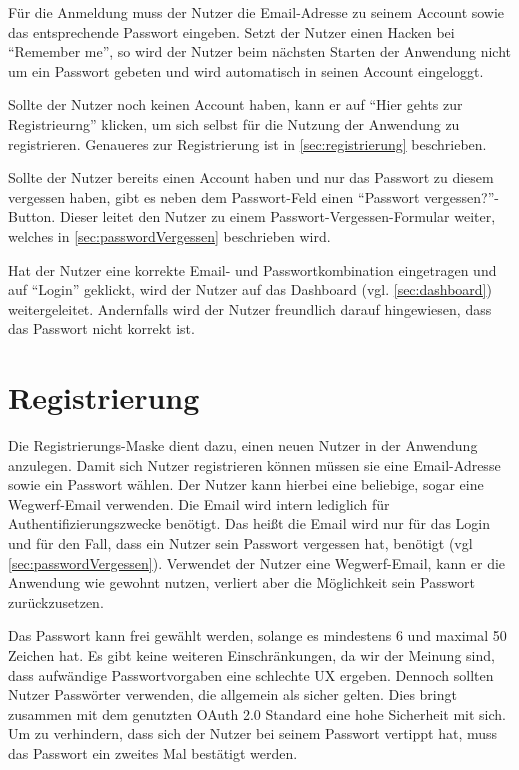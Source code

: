 Für die Anmeldung muss der Nutzer die Email-Adresse zu seinem Account sowie das entsprechende Passwort eingeben.
Setzt der Nutzer einen Hacken bei \enquote{Remember me}, so wird der Nutzer beim nächsten Starten der Anwendung nicht um ein Passwort gebeten und wird automatisch in seinen Account eingeloggt.

Sollte der Nutzer noch keinen Account haben, kann er auf \enquote{Hier gehts zur Registrieurng} klicken, um sich selbst für die Nutzung der Anwendung zu registrieren.
Genaueres zur Registrierung ist in \autoref{sec:registrierung} beschrieben.

Sollte der Nutzer bereits einen Account haben und nur das Passwort zu diesem vergessen haben, gibt es neben dem Passwort-Feld einen \enquote{Passwort vergessen?}-Button.
Dieser leitet den Nutzer zu einem Passwort-Vergessen-Formular weiter, welches in \autoref{sec:passwordVergessen} beschrieben wird.

Hat der Nutzer eine korrekte Email- und Passwortkombination eingetragen und auf \enquote{Login} geklickt, wird der Nutzer auf das Dashboard (vgl. \autoref{sec:dashboard}) weitergeleitet.
Andernfalls wird der Nutzer freundlich darauf hingewiesen, dass das Passwort nicht korrekt ist.



\section{Registrierung}\label{sec:registrierung}
Die Registrierungs-Maske dient dazu, einen neuen Nutzer in der Anwendung anzulegen.
Damit sich Nutzer registrieren können müssen sie eine Email-Adresse sowie ein Passwort wählen.
Der Nutzer kann hierbei eine beliebige, sogar eine Wegwerf-Email verwenden.
Die Email wird intern lediglich für Authentifizierungszwecke benötigt.
Das heißt die Email wird nur für das Login und für den Fall, dass ein Nutzer sein Passwort vergessen hat, benötigt (vgl \autoref{sec:passwordVergessen}).
Verwendet der Nutzer eine Wegwerf-Email, kann er die Anwendung wie gewohnt nutzen, verliert aber die Möglichkeit sein Passwort zurückzusetzen.

Das Passwort kann frei gewählt werden, solange es mindestens 6 und maximal 50 Zeichen hat.
Es gibt keine weiteren Einschränkungen, da wir der Meinung sind, dass aufwändige Passwortvorgaben eine schlechte \ac{UX} ergeben.
Dennoch sollten Nutzer Passwörter verwenden, die allgemein als sicher gelten. Dies bringt zusammen mit dem genutzten OAuth 2.0 Standard eine hohe Sicherheit mit sich. Um zu verhindern, dass sich der Nutzer bei seinem Passwort vertippt hat, muss das Passwort ein zweites Mal bestätigt werden.

